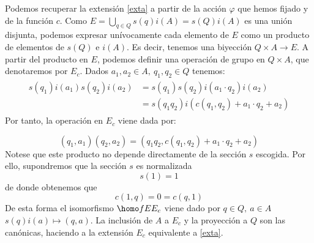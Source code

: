 Podemos recuperar la extensión \eqref{exta} a partir de la acción $\varphi$ que hemos fijado y de la función $c$. Como $E=\bigcup\limits_{q\in Q} s(q)i(A) = s(Q)i(A)$ es una unión disjunta, podemos expresar unívocamente cada elemento de $E$ como un producto de elementos de $s(Q)$ e $i(A)$. Es decir, tenemos una biyección $Q\times A \to E$. A partir del producto en $E$, podemos definir una operación de grupo en $Q\times A$, que denotaremos por $E_{c}$. Dados $a_1,a_2\in A, \ q_1,q_2\in Q$ tenemos:
\begin{align}\begin{split}
s(q_1)i(a_1) s(q_2)i(a_2) &= s(q_1)s(q_2)i(a_1\cdot q_2)i(a_2) \\ &= s(q_1q_2)i(c(q_1,q_2) + a_1\cdot q_2+a_2)
\end{split}\end{align}
\noindent Por tanto, la operación en $E_c$ viene dada por:

\begin{equation}\label{extop}
(q_1,a_1)(q_2,a_2) = (q_1q_2,c(q_1,q_2) + a_1 \cdot q_2 + a_2)
\end{equation}
Notese que este producto no depende directamente de la sección $s$ escogida. Por ello, supondremos que la sección $s$ es normalizada 
\begin{equation}
	s(1) = 1
\end{equation}
de donde obtenemos que
\begin{equation}\label{cocnorm}
	c(1,q) = 0 = c(q,1)
\end{equation}
De esta forma el isomorfismo $\homo f E E_c$ viene dado por $q\in Q,\ a\in A$ $s(q)i(a) \mapsto (q,a)$. La inclusión de $A$ a $E_c$ y la proyección a $Q$ son las canónicas, haciendo a la extensión $E_c$ equivalente a \eqref{exta}.



